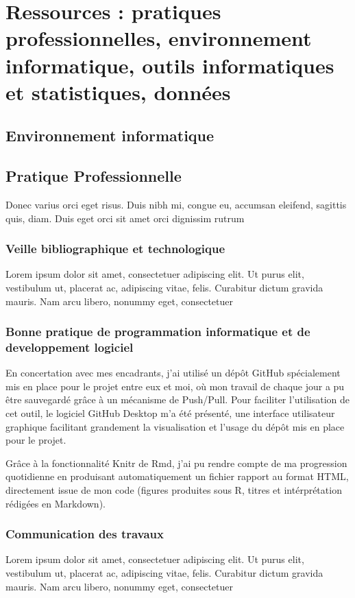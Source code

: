 \documentclass{book}
\begin{document}
\lipsum[1-4]

\thispagestyle{fancy}

\chapter[Ressources]{\label{Second Chapitre}Ressources : pratiques
  professionnelles, environnement informatique, outils informatiques et
  statistiques, données}
\section{Environnement informatique}
\noindent

\section{Pratique Professionnelle}
\noindent
Donec varius orci eget risus. Duis nibh mi, congue eu, accumsan eleifend,
sagittis quis, diam. Duis eget
orci sit amet orci dignissim rutrum

\subsection{Veille bibliographique et technologique}
\noindent
Lorem ipsum dolor sit amet, consectetuer adipiscing elit. Ut purus elit,
vestibulum ut, placerat ac,
adipiscing vitae, felis. Curabitur dictum gravida mauris. Nam arcu libero,
nonummy eget, consectetuer

\subsection[Bonnes pratiques]{Bonne pratique de programmation informatique et
    de developpement logiciel}
\noindent
En concertation avec mes encadrants, j'ai utilisé un dépôt GitHub spécialement
mis en place pour le projet entre eux et moi, où mon travail de chaque jour a
pu être sauvegardé grâce à un mécanisme de Push/Pull. Pour faciliter
l'utilisation de cet outil, le logiciel GitHub Desktop m'a été présenté, une
interface utilisateur graphique facilitant grandement la visualisation et
l'usage du dépôt mis en place pour le projet.

Grâce à la fonctionnalité Knitr de Rmd, j'ai pu rendre compte de ma progression
quotidienne en produisant automatiquement un fichier rapport au format HTML,
directement issue de mon code (figures produites sous R, titres et
intérprétation rédigées en Markdown).

\subsection{Communication des travaux}
\noindent
Lorem ipsum dolor sit amet, consectetuer adipiscing elit. Ut purus elit,
vestibulum ut, placerat ac,
adipiscing vitae, felis. Curabitur dictum gravida mauris. Nam arcu libero,
nonummy eget, consectetuer
\end{document}
